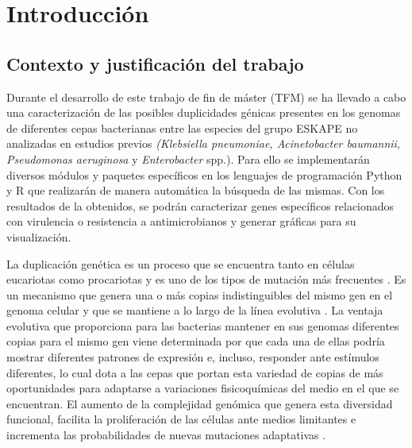 \cleardoublepage
{}
\setcounter{page}{1} 


\chapter{Introducción}
\label{chapter:introduccion}

\section{Contexto y justificación del trabajo}

Durante el desarrollo de este trabajo de fin de máster (TFM) se ha llevado a cabo una caracterización de las posibles duplicidades génicas presentes en los genomas de diferentes cepas bacterianas entre las especies del grupo ESKAPE no analizadas en estudios previos \textit{(Klebsiella pneumoniae, Acinetobacter baumannii, Pseudomonas aeruginosa} y  \textit{Enterobacter} spp.). Para ello se implementarán diversos módulos y paquetes específicos en los lenguajes de programación Python y R que realizarán de manera automática la búsqueda de las mismas. Con los resultados de la obtenidos, se podrán caracterizar genes específicos relacionados con virulencia o resistencia a antimicrobianos y generar gráficas para su visualización.

La duplicación genética es un proceso que se encuentra tanto en células eucariotas como procariotas y es uno de los tipos de mutación más frecuentes \cite{serres_evolution_2009,zhang_evolution_2003}. Es un mecanismo que genera una o más copias indistinguibles del mismo gen en el genoma celular y que se mantiene a lo largo de la línea evolutiva \cite{lynch_genome-wide_2008, lipinski_high_2011, sanchez-herrero_gene_2020, zhang_evolution_2003}. La ventaja evolutiva que proporciona para las bacterias mantener en sus genomas diferentes copias para el mismo gen viene determinada por que cada una de ellas podría mostrar diferentes patrones de expresión e, incluso, responder ante estímulos diferentes, lo cual dota a las cepas que portan esta variedad de copias de más oportunidades para adaptarse a variaciones fisicoquímicas del medio en el que se encuentran. El aumento de la complejidad genómica que genera esta diversidad funcional, facilita la proliferación de las células ante medios limitantes e incrementa las probabilidades de nuevas mutaciones adaptativas \cite{serres_evolution_2009,zhang_evolution_2003}.

